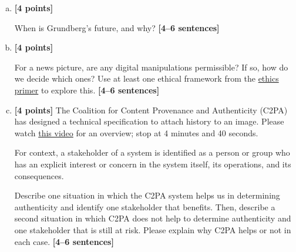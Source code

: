 \documentclass[11pt]{article}
\begin{document}
\begin{enumerate}[(a)]
\item \textbf{[4 points]}
    \begin{tcolorbox}[colback=orange!5!white,colframe=orange!75!black]
        When is Grundberg's future, and why? \textbf{[4--6 sentences]}
    \end{tcolorbox}

\item \textbf{[4 points]}
    \begin{tcolorbox}[colback=orange!5!white,colframe=orange!75!black]
        For a news picture, are any digital manipulations permissible? If so, how do we decide which ones? Use at least one ethical framework from the \href{https://browncsci1430.github.io/resources/ethics_primer/}{ethics primer} to explore this. \textbf{[4--6 sentences]}
    \end{tcolorbox}
    
\pagebreak
\item \textbf{[4 points]}
    The Coalition for Content Provenance and Authenticity (C2PA) has designed a technical specification to attach history to an image. Please watch \href{https://www.youtube.com/watch?v=hA0ZjqakEF8}{this video} for an overview; stop at 4 minutes and 40 seconds.

    For context, a stakeholder of a system is identified as a person or group who has an explicit interest or concern in the system itself, its operations, and its consequences.
    
    \begin{tcolorbox}[colback=orange!5!white,colframe=orange!75!black]
        Describe one situation in which the C2PA system helps us in determining authenticity and identify one stakeholder that benefits. Then, describe a second situation in which C2PA does not help to determine authenticity and one stakeholder that is still at risk. Please explain why C2PA helps or not in each case. \textbf{[4--6 sentences]}
    \end{tcolorbox}
\end{enumerate}
\end{document}
